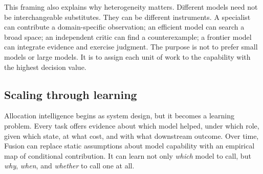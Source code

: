 This framing also explains why heterogeneity matters. Different models need
not be interchangeable substitutes. They can be different instruments. A
specialist can contribute a domain-specific observation; an efficient model can
search a broad space; an independent critic can find a counterexample; a
frontier model can integrate evidence and exercise judgment. The purpose is not
to prefer small models or large models. It is to assign each unit of work to
the capability with the highest decision value.

\subsection{Scaling through learning}

Allocation intelligence begins as system design, but it becomes a learning
problem. Every task offers evidence about which model helped, under which role,
given which state, at what cost, and with what downstream outcome. Over time,
Fusion can replace static assumptions about model capability with an empirical
map of conditional contribution. It can learn not only \emph{which} model to
call, but \emph{why}, \emph{when}, and \emph{whether} to call one at all.

